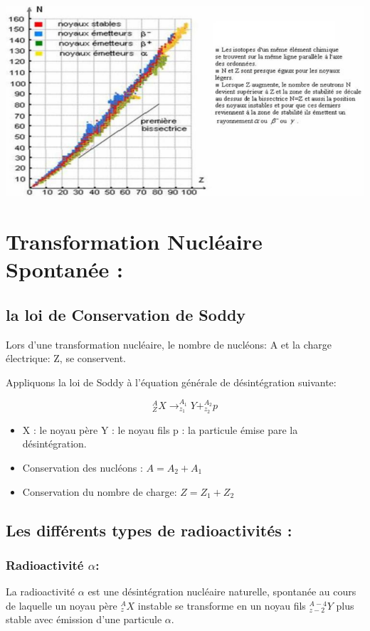 \documentclass[12pt]{article}
\begin{document}
\begin{center}

	\includegraphics[width=1\textwidth]{./img/nuc03.png}

\end{center}

\section{Transformation Nucléaire Spontanée : }
\subsection{la loi de Conservation de Soddy}
Lors d’une transformation nucléaire, le nombre de nucléons: A et la charge électrique: Z, se conservent.

Appliquons la loi de Soddy à l'équation générale de désintégration suivante: 

$$_Z^AX \rightarrow _{z_1}^{A_1}Y + _{z_2}^{A_2}p$$

\begin{itemize}
	\item X : le noyau père \hspace{0.5cm} Y : le noyau fils \hspace{0.5cm } p : la particule émise pare la désintégration.
	\item Conservation des nucléons : $A = A_2 + A_1$
	\item Conservation du nombre de charge: $Z = Z_1 + Z_2$
\end{itemize}

\subsection{Les différents types de radioactivités : }
\subsubsection{ Radioactivité $\alpha$: }
La radioactivité $\alpha$ est une désintégration nucléaire naturelle, spontanée au cours de laquelle un noyau père $_z^AX$ instable se transforme en un noyau fils $_{z-2}^{A-4}Y$
plus stable avec émission d'une particule $\alpha$.
\end{document}
